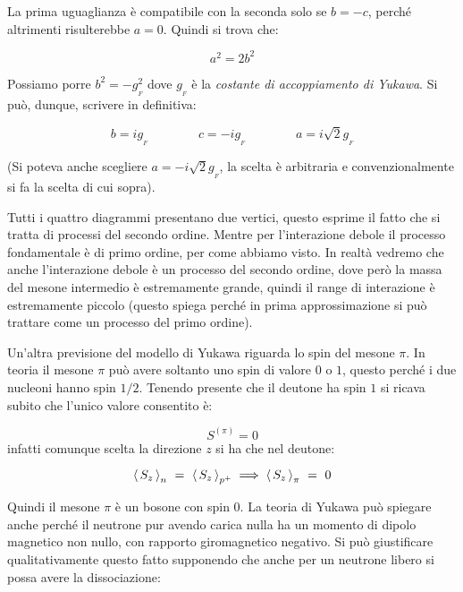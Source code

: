 La prima uguaglianza è compatibile con la seconda solo se $b = -c$, perché
altrimenti risulterebbe $a = 0$. Quindi si trova che:

\begin{equation*}
a^2=2b^2
\end{equation*}

Possiamo porre $b^2 = - g^2_{_{F}}$ dove $g_{_{F}}$ è la \textit{costante di
accoppiamento di Yukawa}.
Si può, dunque, scrivere in definitiva:

\begin{equation*}
b= i g_{_{F}} \qquad \qquad  c = - i g_{_{F}} \qquad \qquad a = i \sqrt{2}  g_{_{F}}
\end{equation*}

(Si poteva anche scegliere $ a = - i \sqrt{2}  g_{_{F}}$, la scelta è arbitraria
e convenzionalmente si fa la scelta di cui sopra).

Tutti i quattro diagrammi presentano due vertici, questo esprime il fatto che si
tratta di processi del secondo ordine. Mentre per l'interazione debole il
processo fondamentale è di primo ordine, per come abbiamo visto. In realtà
vedremo che anche l'interazione debole è un processo del secondo ordine, dove
però la massa del mesone intermedio è estremamente grande, quindi il range di
interazione è estremamente piccolo (questo spiega perché in prima
approssimazione si può trattare come un processo del primo ordine). 

Un'altra previsione del modello di Yukawa riguarda lo spin del mesone $\pi$. 
In teoria il mesone $\pi$ può avere soltanto uno spin di valore $0$ o $1$,
questo perché i due nucleoni hanno spin $1/2$. Tenendo presente che il deutone
ha spin $1$ si ricava subito che l'unico valore consentito è:

\begin{equation*}
S^{(\pi)} = 0
\end{equation*}
infatti comunque scelta la direzione $z$ si ha che nel deutone:

\begin{equation*}
  \left\langle\, S_z \,\right\rangle_n \ = \ \left\langle\, S_z \,\right\rangle_{p^+} \implies \left\langle\, S_z \,\right\rangle_{\pi} \ = \ 0
\end{equation*}

Quindi il mesone $\pi$ è un bosone con spin 0. 
La teoria di Yukawa può spiegare anche perché il neutrone pur avendo carica
nulla ha un momento di dipolo magnetico non nullo, con rapporto giromagnetico
negativo. Si può giustificare qualitativamente questo fatto supponendo che anche
per un neutrone libero si possa avere la dissociazione:

